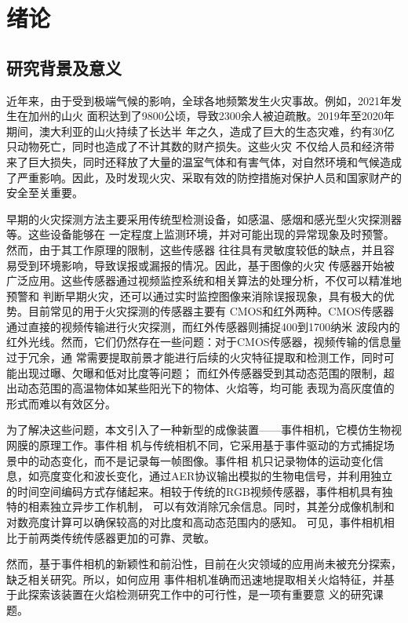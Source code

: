 
\chapter{绪论}

\section{研究背景及意义}

近年来，由于受到极端气候的影响，全球各地频繁发生火灾事故。例如，2021年发生在加州的山火
面积达到了9800公顷，导致2300余人被迫疏散。2019年至2020年期间，澳大利亚的山火持续了长达半
年之久，造成了巨大的生态灾难，约有30亿只动物死亡，同时也造成了不计其数的财产损失。这些火灾
不仅给人员和经济带来了巨大损失，同时还释放了大量的温室气体和有害气体，对自然环境和气候造成
了严重影响。因此，及时发现火灾、采取有效的防控措施对保护人员和国家财产的安全至关重要。

早期的火灾探测方法主要采用传统型检测设备，如感温、感烟和感光型火灾探测器等。这些设备能够在
一定程度上监测环境，并对可能出现的异常现象及时预警。然而，由于其工作原理的限制，这些传感器
往往具有灵敏度较低的缺点，并且容易受到环境影响，导致误报或漏报的情况。因此，基于图像的火灾
传感器开始被广泛应用。这些传感器通过视频监控系统和相关算法的处理分析，不仅可以精准地预警和
判断早期火灾，还可以通过实时监控图像来消除误报现象，具有极大的优势。目前常见的用于火灾探测的传感器主要有
CMOS和红外两种。CMOS传感器通过直接的视频传输进行火灾探测，而红外传感器则捕捉400到1700纳米
波段内的红外光线。然而，它们仍然存在一些问题：对于CMOS传感器，视频传输的信息量过于冗余，通
常需要提取前景才能进行后续的火灾特征提取和检测工作，同时可能出现过曝、欠曝和低对比度等问题；
而红外传感器受到其动态范围的限制，超出动态范围的高温物体如某些阳光下的物体、火焰等，均可能
表现为高灰度值的形式而难以有效区分。

为了解决这些问题，本文引入了一种新型的成像装置——事件相机，它模仿生物视网膜的原理工作\cite{gallego2020event,posch2014retinomorphic}。事件相
机与传统相机不同，它采用基于事件驱动的方式捕捉场景中的动态变化，而不是记录每一帧图像。事件相
机只记录物体的运动变化信息，如亮度变化和波长变化，通过AER协议\cite{rivas2005tools}输出模拟的生物电信号，并利用独立
的时间空间编码方式存储起来。相较于传统的RGB视频传感器，事件相机具有独特的相素独立异步工作机制，
可以有效消除冗余信息。同时，其差分成像机制和对数亮度计算可以确保较高的对比度和高动态范围内的感知。
可见，事件相机相比于前两类传统传感器更加的可靠、灵敏。

然而，基于事件相机的新颖性和前沿性，目前在火灾领域的应用尚未被充分探索，缺乏相关研究。所以，如何应用
事件相机准确而迅速地提取相关火焰特征，并基于此探索该装置在火焰检测研究工作中的可行性，是一项有重要意
义的研究课题。

